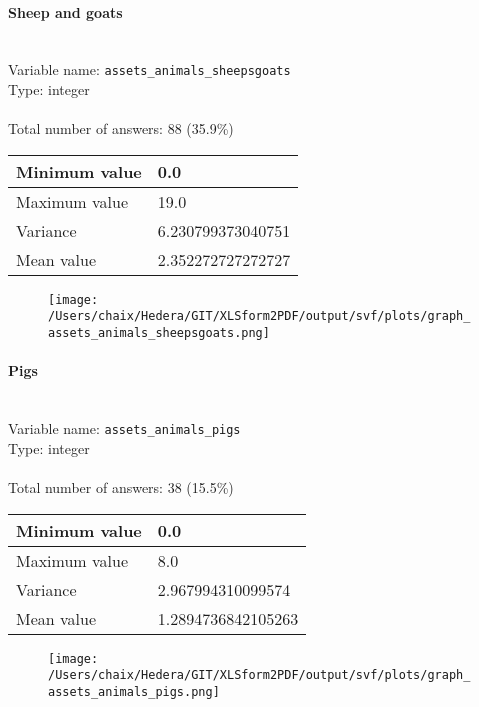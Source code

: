 \documentclass[11.5pt, a4paper]{scrartcl}
\begin{document}
\paragraph{Sheep and goats}
\  \\Variable name: \texttt{assets\_animals\_sheepsgoats}\\
Type: integer\\
\\Total number of answers: 88 (35.9\%)
\\[0.2em] \begin{tabular}{p{4cm}|p{8cm}}
Minimum value &0.0 \\
\hline
\cellcolor{mygray} Maximum value & \cellcolor{mygray}19.0 \\
\hline
Variance &6.230799373040751 \\
\hline
\cellcolor{mygray} Mean value & \cellcolor{mygray}2.352272727272727 \\
\hline
\end{tabular}
\begin{figure}[H]
\centering
\texttt{[image: /Users/chaix/Hedera/GIT/XLSform2PDF/output/svf/plots/graph\_assets\_animals\_sheepsgoats.png]}
\end{figure}
\paragraph{Pigs}
\  \\Variable name: \texttt{assets\_animals\_pigs}\\
Type: integer\\
\\Total number of answers: 38 (15.5\%)
\\[0.2em] \begin{tabular}{p{4cm}|p{8cm}}
Minimum value &0.0 \\
\hline
\cellcolor{mygray} Maximum value & \cellcolor{mygray}8.0 \\
\hline
Variance &2.967994310099574 \\
\hline
\cellcolor{mygray} Mean value & \cellcolor{mygray}1.2894736842105263 \\
\hline
\end{tabular}
\begin{figure}[H]
\centering
\texttt{[image: /Users/chaix/Hedera/GIT/XLSform2PDF/output/svf/plots/graph\_assets\_animals\_pigs.png]}
\end{figure}
\end{document}
